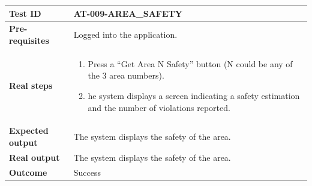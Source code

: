 \begin{table}[H]
    \centering
    \begin{tabular}{p{3cm}p{10cm}}
    \textbf{Test ID} & AT-009-AREA\_SAFETY \\ \hline
    \textbf{Pre-requisites} & Logged into the application. \\ \hline
    \textbf{Real steps} & 
        \begin{enumerate} \itemsep0em
            \item Press a “Get Area N Safety” button (N could be any of the 3 area numbers).
            \item he system displays a screen indicating a safety estimation and the number of violations reported.
        \end{enumerate} \\ \hline
    \textbf{Expected output} & The system displays the safety of the area. \\ \hline
    \textbf{Real output} & The system displays the safety of the area. \\ \hline
    \textbf{Outcome} & Success \\ \hline
    \end{tabular}
\end{table}


